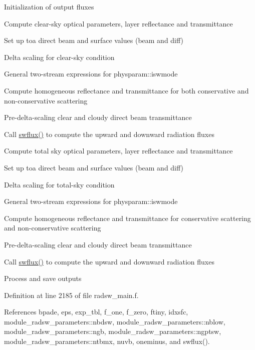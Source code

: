 \begin{DoxyEnumerate}
\item Initialization of output fluxes
\item Compute clear-\/sky optical parameters, layer reflectance and transmittance
\begin{DoxyItemize}
\item Set up toa direct beam and surface values (beam and diff)
\item Delta scaling for clear-\/sky condition
\item General two-\/stream expressions for physparam\+::iswmode
\item Compute homogeneous reflectance and transmittance for both conservative and non-\/conservative scattering
\item Pre-\/delta-\/scaling clear and cloudy direct beam transmittance
\item Call \hyperlink{group__module__radsw__main_ga53ae1cb0229a048545027667adcc3cd7}{swflux()} to compute the upward and downward radiation fluxes
\end{DoxyItemize}
\item Compute total sky optical parameters, layer reflectance and transmittance
\begin{DoxyItemize}
\item Set up toa direct beam and surface values (beam and diff)
\item Delta scaling for total-\/sky condition
\item General two-\/stream expressions for physparam\+::iswmode
\item Compute homogeneous reflectance and transmittance for conservative scattering and non-\/conservative scattering
\item Pre-\/delta-\/scaling clear and cloudy direct beam transmittance
\item Call \hyperlink{group__module__radsw__main_ga53ae1cb0229a048545027667adcc3cd7}{swflux()} to compute the upward and downward radiation fluxes
\end{DoxyItemize}
\item Process and save outputs 
\end{DoxyEnumerate}

Definition at line 2185 of file radsw\+\_\+main.\+f.



References bpade, eps, exp\+\_\+tbl, f\+\_\+one, f\+\_\+zero, ftiny, idxsfc, module\+\_\+radsw\+\_\+parameters\+::nbdsw, module\+\_\+radsw\+\_\+parameters\+::nblow, module\+\_\+radsw\+\_\+parameters\+::ngb, module\+\_\+radsw\+\_\+parameters\+::ngptsw, module\+\_\+radsw\+\_\+parameters\+::ntbmx, nuvb, oneminus, and swflux().



